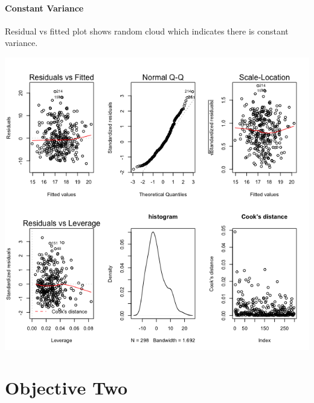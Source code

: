 \documentclass[american,]{article}
\let\oldparagraph\paragraph
\renewcommand{\paragraph}[1]{\oldparagraph{#1}\mbox{}}
\begin{document}
\paragraph{Constant Variance}
Residual vs fitted plot shows random cloud which indicates there is constant variance.

\graphicspath{ {images/} }
\includegraphics{img002.png}

\section{Objective Two}\label{objective-two}

\renewcommand\refname{Conclusion}





\end{document}
